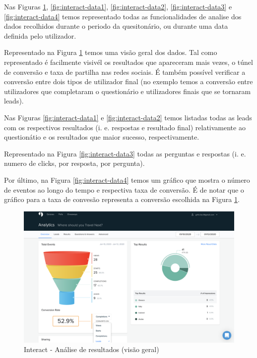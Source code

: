 Nas Figuras \ref{fig:interact-data}, \ref{fig:interact-data1}, \ref{fig:interact-data2}, \ref{fig:interact-data3} e \ref{fig:interact-data4} temos representado todas as funcionalidades de analise dos dados recolhidos durante o periodo da quesitonário, ou durante uma data definida pelo utilizador.

Representado na Figura \ref{fig:interact-data} temos uma visão geral dos dados. Tal como representado é facilmente visivél os resultados que apareceram mais vezes, o túnel de conversão e taxa de partilha nas redes sociais. É também possível verificar a conversão entre dois tipos de utilizador final (no exemplo temos a conversão entre utilizadores que completaram o questionário e utilizadores finais que se tornaram leads). 

Nas Figuras \ref{fig:interact-data1} e \ref{fig:interact-data2}  temos listadas todas as leads com os respectivos resultados (i. e. respostas e resultado final) relativamente ao questionátio e os resultados que maior sucesso, respectivamente.

Representado na Figura \ref{fig:interact-data3}  todas as perguntas e respostas (i. e. numero de clicks, por resposta, por pergunta). 

Por último, na Figura \ref{fig:interact-data4} temos um gráfico que mostra o número de eventos ao longo do tempo e respectiva taxa de conversão. É de notar que o gráfico para a taxa de convesão representa a conversão escolhida na Figura \ref{fig:interact-data}.


\mbox{}
\begin{figure}[ht!]
	\begin{center}
		\includegraphics[width=1\textwidth]{img/interact/data}
		\caption{Interact - Análise de resultados (visão geral)}
		\label{fig:interact-data}
	\end{center}
\end{figure}


